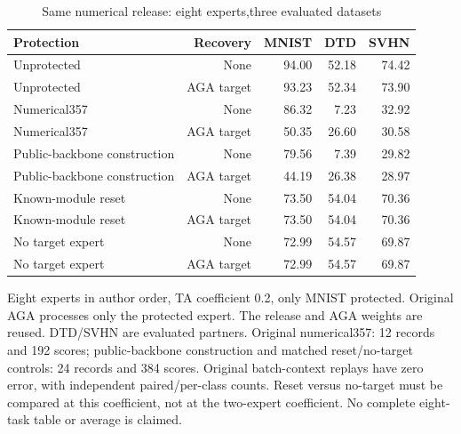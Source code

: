 \begin{table}[!htbp]
\centering
\small
\caption{Same numerical release: eight experts,three evaluated datasets}
\label{tab:numerical_eight}
\begin{tabular}{lrrrr}
\toprule
Protection & Recovery & MNIST & DTD & SVHN \\
\midrule
Unprotected & None & 94.00 & 52.18 & 74.42 \\
Unprotected & AGA target & 93.23 & 52.34 & 73.90 \\
Numerical357 & None & 86.32 & 7.23 & 32.92 \\
Numerical357 & AGA target & 50.35 & 26.60 & 30.58 \\
Public-backbone construction & None & 79.56 & 7.39 & 29.82 \\
Public-backbone construction & AGA target & 44.19 & 26.38 & 28.97 \\
Known-module reset & None & 73.50 & 54.04 & 70.36 \\
Known-module reset & AGA target & 73.50 & 54.04 & 70.36 \\
No target expert & None & 72.99 & 54.57 & 69.87 \\
No target expert & AGA target & 72.99 & 54.57 & 69.87 \\
\bottomrule
\end{tabular}
\par\vspace{3pt}\begin{minipage}{0.98\linewidth}\footnotesize Eight experts in author order, TA coefficient 0.2, only MNIST protected. Original AGA processes only the protected expert. The release and AGA weights are reused. DTD/SVHN are evaluated partners. Original numerical357: 12 records and 192 scores; public-backbone construction and matched reset/no-target controls: 24 records and 384 scores. Original batch-context replays have zero error, with independent paired/per-class counts. Reset versus no-target must be compared at this coefficient, not at the two-expert coefficient. No complete eight-task table or average is claimed.\end{minipage}
\end{table}

